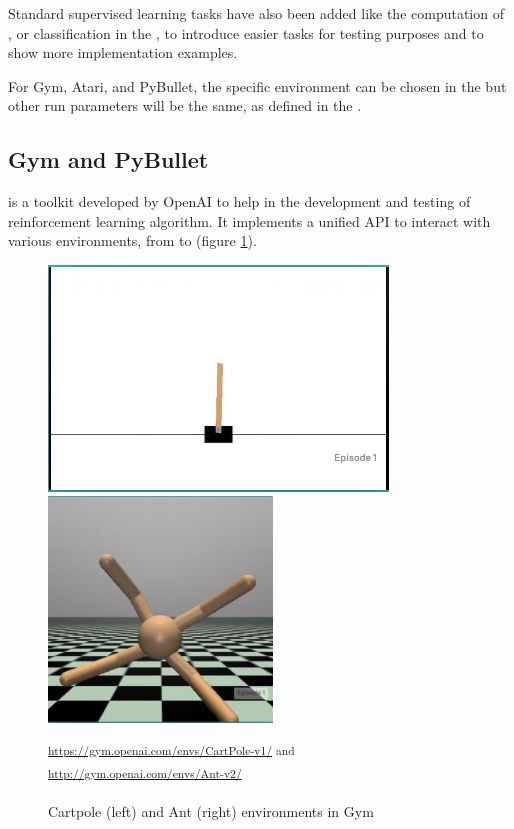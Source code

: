 Standard supervised learning tasks have also been added like the computation of , or classification in the , to introduce easier tasks for testing purposes and to show more implementation examples.

For Gym, Atari, and PyBullet, the specific environment can be chosen in the  but other run parameters will be the same, as defined in the .

\subsection{Gym and PyBullet}
 is a toolkit developed by OpenAI to help in the development and testing of reinforcement learning algorithm. It implements a unified API to interact with various environments, from  to  (figure \ref{fig:gym}).

\begin{figure}[H]
 \centering
 \captionsetup{justification=centering, margin=0.5cm}
\includegraphics[height=6cm]{images/cartpole.PNG}
\includegraphics[height=6cm]{images/ant.PNG}
\caption{Cartpole (left) and Ant (right) environments in Gym}
 \small\textsuperscript{\url{https://gym.openai.com/envs/CartPole-v1/} and  \url{http://gym.openai.com/envs/Ant-v2/}}
 \label{fig:gym}
\end{figure}

